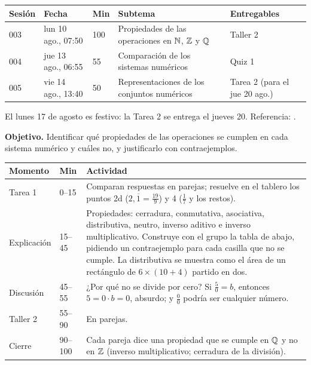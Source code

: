 \documentclass[11pt]{article}
\begin{document}
\encabezado*

\begin{center}
{\renewcommand{\arraystretch}{1.3}
\begin{tabularx}{\linewidth}{@{}l l l X l@{}}
  \toprule
  \textbf{Sesión} & \textbf{Fecha} & \textbf{Min} & \textbf{Subtema} & \textbf{Entregables}\\
  \midrule
  003 & lun 10 ago., 07:50 & 100 & Propiedades de las operaciones en $\mathbb{N}$, $\mathbb{Z}$ y $\mathbb{Q}$ & Taller 2\\
  004 & jue 13 ago., 06:55 & 55  & Comparación de los sistemas numéricos & Quiz 1\\
  005 & vie 14 ago., 13:40 & 50  & Representaciones de los conjuntos numéricos & Tarea 2 (para el jue 20 ago.)\\
  \bottomrule
\end{tabularx}}
\end{center}

\small El lunes 17 de agosto es festivo: la Tarea 2 se entrega el jueves 20. \normalsize
Referencia: .


\textbf{Objetivo.} Identificar qué propiedades de las operaciones se cumplen en cada sistema
numérico y cuáles no, y justificarlo con contraejemplos.

\begin{center}
{\renewcommand{\arraystretch}{1.3}
\begin{tabularx}{\linewidth}{@{}l l X@{}}
  \toprule
  \textbf{Momento} & \textbf{Min} & \textbf{Actividad}\\
  \midrule
  Tarea 1 & 0–15 & Comparan respuestas en parejas; resuelve en el tablero los puntos 2d
    ($2{,}\overline{1} = \frac{19}{9}$) y 4 ($\frac{1}{7}$ y los restos).\\
  Explicación & 15–45 & Propiedades: cerradura, conmutativa, asociativa, distributiva,
    neutro, inverso aditivo e inverso multiplicativo. Construye con el grupo la tabla de
    abajo, pidiendo un contraejemplo para cada casilla que no se cumple. La distributiva se
    muestra como el área de un rectángulo de $6 \times (10 + 4)$ partido en dos.\\
  Discusión & 45–55 & ¿Por qué no se divide por cero? Si $\frac{5}{0} = b$, entonces
    $5 = 0 \cdot b = 0$, absurdo; y $\frac{0}{0}$ podría ser cualquier número.\\
  Taller 2 & 55–90 & En parejas.\\
  Cierre & 90–100 & Cada pareja dice una propiedad que se cumple en $\mathbb{Q}$ y no en $\mathbb{Z}$
    (inverso multiplicativo; cerradura de la división).\\
  \bottomrule
\end{tabularx}}
\end{center}
\end{document}
